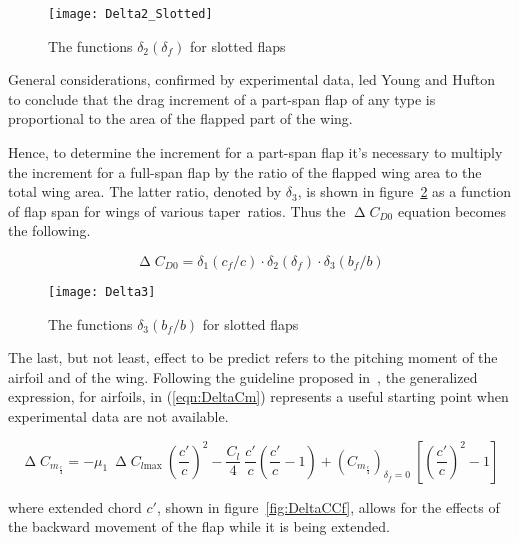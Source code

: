 \begin{figure}[H]
  \centering
  \texttt{[image: Delta2\_Slotted]}
  \caption{The functions $\delta_2\left(\delta_f\right)$ for slotted flaps}
  \label{fig:Delta2Slotted}
\end{figure}

\bigskip
\noindent
General considerations, confirmed by experimental data, led Young and Hufton to conclude that the drag increment of a part-span flap of any type is proportional to the area of the flapped part of the wing.

\noindent
Hence, to determine the increment for a part-span flap it's necessary to multiply the increment for a full-span flap by the ratio of the flapped wing area to the total wing area. The latter ratio, denoted by $\delta_3$, is shown in figure~\ref{fig:Delta3} as a function of flap span for wings of various taper~ratios. Thus the $\upDelta C_{D0}$ equation becomes the following.

\begin{equation}
\upDelta C_{D0}=\delta_1\left(c_f/c\right)\cdot\delta_2\left(\delta_f\right)\cdot\delta_3\left(b_f/b\right)
\label{eqn:DeltaCD0PartSpan}
\end{equation}

\begin{figure}[!b]
  \centering
  \texttt{[image: Delta3]}
  \caption{The functions $\delta_3\left(b_f/b\right)$ for slotted flaps}
  \label{fig:Delta3}
\end{figure}

\bigskip
\noindent
The last, but not least, effect to be predict refers to the pitching moment of the airfoil and of the wing. Following the guideline proposed in~\cite{torenbeek1982synthesis}, the generalized expression, for airfoils, in (\ref{eqn:DeltaCm}) represents a useful starting point when experimental data are not available.

\begin{equation}
\upDelta C_{m_{\frac{c}{4}}}=-\mu_1\ \upDelta C_{l\text{max}}\ \left(\dfrac{c'}{c}\right)^2-\dfrac{C_l}{4}\ \dfrac{c'}{c}\left(\dfrac{c'}{c}-1\right)+\left(C_{m_{\frac{c}{4}}}\right)_{\delta_f=0}\ \left[\left(\dfrac{c'}{c}\right)^2-1\right]
\label{eqn:DeltaCm}
\end{equation}

where extended chord $c'$, shown in figure~\ref{fig:DeltaCCf}, allows for the effects of the backward movement of the flap while it is being extended.

